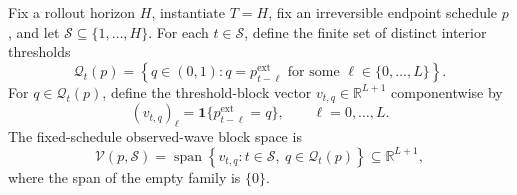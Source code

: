 Fix a rollout horizon \(H\), instantiate \(T=H\), fix an irreversible endpoint schedule \(p\), and let \(\mathcal S\subseteq\{1,\ldots,H\}\).  For each \(t\in\mathcal S\), define the finite set of distinct interior thresholds
\[
 \mathcal Q_t(p)
 =\left\{q\in(0,1):q=p^{\mathrm{ext}}_{t-\ell}
       \text{ for some }\ell\in\{0,\ldots,L\}\right\}.
\]
For \(q\in\mathcal Q_t(p)\), define the threshold-block vector \(v_{t,q}\in\mathbb R^{L+1}\) componentwise by
\[
 (v_{t,q})_\ell
 =\mathbf 1\{p^{\mathrm{ext}}_{t-\ell}=q\},
 \qquad \ell=0,\ldots,L.
\]
The fixed-schedule observed-wave block space is
\[
 \mathcal V(p,\mathcal S)
 =\operatorname{span}\left\{v_{t,q}:
       t\in\mathcal S,\ q\in\mathcal Q_t(p)\right\}
 \subseteq\mathbb R^{L+1},
\]
where the span of the empty family is \(\{0\}\).